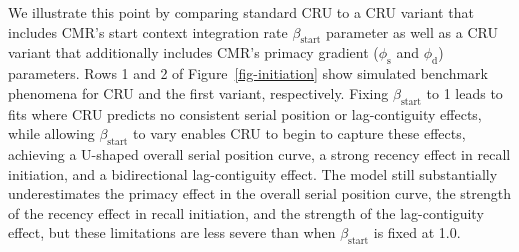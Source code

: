 \documentclass[
  man,
  floatsintext,
  longtable,
  nolmodern,
  notxfonts,
  notimes,
  draftfirst,
  colorlinks=true,linkcolor=blue,citecolor=blue,urlcolor=blue]{apa7}
\begin{document}
We illustrate this point by comparing standard CRU to a CRU variant that
includes CMR's start context integration rate \(\beta_\text{start}\)
parameter as well as a CRU variant that additionally includes CMR's
primacy gradient (\(\phi_\text{s}\) and \(\phi_\text{d}\)) parameters.
Rows 1 and 2 of Figure~\ref{fig-initiation} show simulated benchmark
phenomena for CRU and the first variant, respectively. Fixing
\(\beta_\text{start}\) to 1 leads to fits where CRU predicts no
consistent serial position or lag-contiguity effects, while allowing
\(\beta_\text{start}\) to vary enables CRU to begin to capture these
effects, achieving a U-shaped overall serial position curve, a strong
recency effect in recall initiation, and a bidirectional lag-contiguity
effect. The model still substantially underestimates the primacy effect
in the overall serial position curve, the strength of the recency effect
in recall initiation, and the strength of the lag-contiguity effect, but
these limitations are less severe than when \(\beta_\text{start}\) is
fixed at 1.0.
\end{document}
